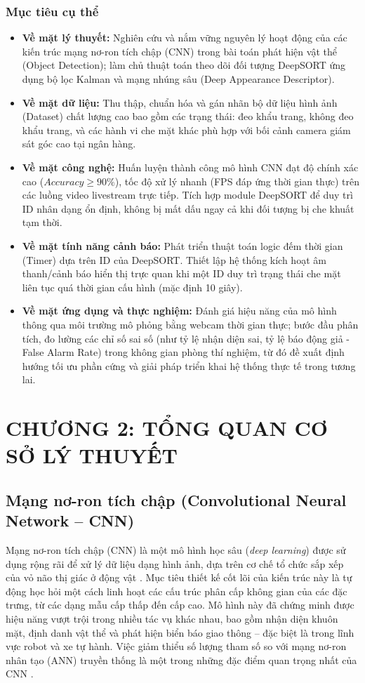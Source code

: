 \documentclass[a4paper,12pt]{article}
\begin{document}
\subsubsection{Mục tiêu cụ thể}
\begin{itemize}
    \item \textbf{Về mặt lý thuyết:} Nghiên cứu và nắm vững nguyên lý hoạt động của các kiến trúc mạng nơ-ron tích chập (CNN) trong bài toán phát hiện vật thể (Object Detection); làm chủ thuật toán theo dõi đối tượng DeepSORT ứng dụng bộ lọc Kalman và mạng nhúng sâu (Deep Appearance Descriptor).
    \item \textbf{Về mặt dữ liệu:} Thu thập, chuẩn hóa và gán nhãn bộ dữ liệu hình ảnh (Dataset) chất lượng cao bao gồm các trạng thái: đeo khẩu trang, không đeo khẩu trang, và các hành vi che mặt khác phù hợp với bối cảnh camera giám sát góc cao tại ngân hàng.
    \item \textbf{Về mặt công nghệ:} Huấn luyện thành công mô hình CNN đạt độ chính xác cao ($Accuracy \ge 90\%$), tốc độ xử lý nhanh (FPS đáp ứng thời gian thực) trên các luồng video livestream trực tiếp. Tích hợp module DeepSORT để duy trì ID nhân dạng ổn định, không bị mất dấu ngay cả khi đối tượng bị che khuất tạm thời.
    \item \textbf{Về mặt tính năng cảnh báo:} Phát triển thuật toán logic đếm thời gian (Timer) dựa trên ID của DeepSORT. Thiết lập hệ thống kích hoạt âm thanh/cảnh báo hiển thị trực quan khi một ID duy trì trạng thái che mặt liên tục quá thời gian cấu hình (mặc định 10 giây).
    \item \textbf{Về mặt ứng dụng và thực nghiệm:} Đánh giá hiệu năng của mô hình thông qua môi trường mô phỏng bằng webcam thời gian thực; bước đầu phân tích, đo lường các chỉ số sai số (như tỷ lệ nhận diện sai, tỷ lệ báo động giả - False Alarm Rate) trong không gian phòng thí nghiệm, từ đó đề xuất định hướng tối ưu phần cứng và giải pháp triển khai hệ thống thực tế trong tương lai.
\end{itemize}

\newpage
\section{CHƯƠNG 2: TỔNG QUAN CƠ SỞ LÝ THUYẾT}
\subsection{Mạng nơ-ron tích chập (Convolutional Neural Network -- CNN)}

Mạng nơ-ron tích chập (CNN) là một mô hình học sâu (\textit{deep learning}) được sử dụng rộng rãi để xử lý dữ liệu dạng hình ảnh, dựa trên cơ chế tổ chức sắp xếp của vỏ não thị giác ở động vật \cite{1}. Mục tiêu thiết kế cốt lõi của kiến trúc này là tự động học hỏi một cách linh hoạt các cấu trúc phân cấp không gian của các đặc trưng, từ các dạng mẫu cấp thấp đến cấp cao. Mô hình này đã chứng minh được hiệu năng vượt trội trong nhiều tác vụ khác nhau, bao gồm nhận diện khuôn mặt, định danh vật thể và phát hiện biển báo giao thông -- đặc biệt là trong lĩnh vực robot và xe tự hành. Việc giảm thiểu số lượng tham số so với mạng nơ-ron nhân tạo (ANN) truyền thống là một trong những đặc điểm quan trọng nhất của CNN \cite{1}.
\end{document}
